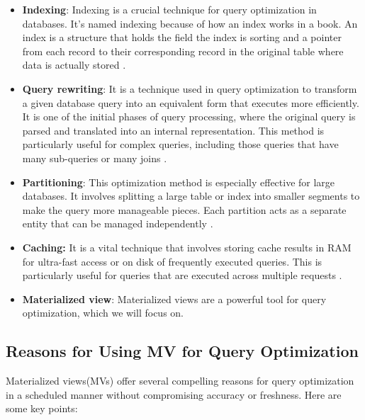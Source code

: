  \begin{itemize}
     \item \textbf{Indexing}: Indexing is a crucial technique for query optimization in databases. It's named indexing because of how an index works in a book. An index is a structure that holds the field the index is sorting and a pointer from each record to their corresponding record in the original table where data is actually stored \cite{tomar-2021,atlassian-no-date}.
     \item \textbf{Query rewriting}: It is a technique used in query optimization to transform a given database query into an equivalent form that executes more efficiently. It is one of the initial phases of query processing, where the original query is parsed and translated into an internal representation. This method is particularly useful for complex queries, including those queries that have many sub-queries or many joins \cite{pitoura-2009,unknown-IBM-25-2024}.
     
     \item \textbf{Partitioning}: This optimization method is especially effective for large databases. It involves splitting a large table or index into smaller segments to make the query more manageable pieces. Each partition acts as a separate entity that can be managed independently \cite{planck-2024}.
     
     \item \textbf{Caching:} It is a vital technique that involves storing cache results in RAM for ultra-fast access or on disk of frequently executed queries. This is particularly useful for queries that are executed across multiple requests \cite{Bit-Fetch-2024}.
     
     \item \textbf{Materialized view}: Materialized views are a powerful tool for query optimization, which we will focus on. 
 \end{itemize}
 
 \subsection{Reasons for Using MV for Query Optimization}
 Materialized views(MVs) offer several compelling reasons for query optimization in a scheduled manner without compromising accuracy or freshness. Here are some key points:
 
